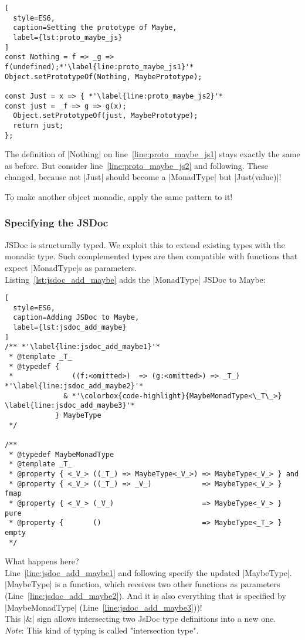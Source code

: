 \begin{lstlisting}[
  style=ES6,
  caption=Setting the prototype of Maybe,
  label={lst:proto_maybe_js}
]
const Nothing = f => _g => f(undefined);*'\label{line:proto_maybe_js1}'*
Object.setPrototypeOf(Nothing, MaybePrototype);

const Just = x => { *'\label{line:proto_maybe_js2}'*
const just = _f => g => g(x);
  Object.setPrototypeOf(just, MaybePrototype);
  return just;
};
\end{lstlisting}

The definition of |Nothing| on line~\ref{line:proto_maybe_js1} stays exactly the
same as before. But consider line~\ref{line:proto_maybe_js2} and following.
These changed, because not |Just| should become a |MonadType| but
|Just(value)|!

To make another object monadic, apply the same pattern to it!



\subsubsection{Specifying the JSDoc} %
\label{sec:Specify the JSDoc}
JSDoc is structurally typed. We exploit this to extend existing types with
the monadic type. Such complemented types are then compatible with functions
that expect |MonadType|s as parameters. \\ 
Listing~\ref{lst:jsdoc_add_maybe} adds the |MonadType| JSDoc to Maybe:

\begin{lstlisting}[
  style=ES6,
  caption=Adding JSDoc to Maybe,
  label={lst:jsdoc_add_maybe}
]
/** *'\label{line:jsdoc_add_maybe1}'*
 * @template _T_
 * @typedef { 
 *              ((f:<omitted>)  => (g:<omitted>) => _T_) *'\label{line:jsdoc_add_maybe2}'*
              & *'\colorbox{code-highlight}{MaybeMonadType<\_T\_>} \label{line:jsdoc_add_maybe3}'*
            } MaybeType
 */

/** 
 * @typedef MaybeMonadType
 * @template _T_
 * @property { <_V_> ((_T_) => MaybeType<_V_>) => MaybeType<_V_> } and
 * @property { <_V_> ((_T_) => _V_)            => MaybeType<_V_> } fmap
 * @property { <_V_> (_V_)                     => MaybeType<_V_> } pure
 * @property {       ()                        => MaybeType<_T_> } empty
 */
\end{lstlisting}

What happens here? \\ 
Line~\ref{line:jsdoc_add_maybe1} and following specify the updated |MaybeType|.
|MaybeType| is a function, which receives two other functions as parameters
(Line~\ref{line:jsdoc_add_maybe2}). And it is also everything that is specified by
|MaybeMonadType| (Line~\ref{line:jsdoc_add_maybe3}))! \\
This |&| sign allows intersecting two JsDoc type definitions into a new one.\\
\textit{Note}: This kind of typing is called "intersection type".

